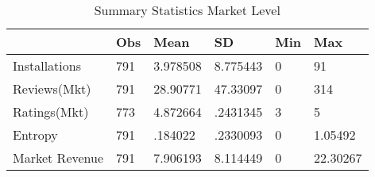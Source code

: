 \begin{table}
\centering
\begin{tabular}{@{}llllll@{}}
\toprule
               & Obs & Mean     & SD       & Min & Max      \\ \midrule
Installations  & 791 & 3.978508 & 8.775443 & 0   & 91       \\
Reviews(Mkt)   & 791 & 28.90771 & 47.33097 & 0   & 314      \\
Ratings(Mkt)   & 773 & 4.872664 & .2431345 & 3   & 5        \\
Entropy        & 791 & .184022  & .2330093 & 0   & 1.05492  \\
Market Revenue & 791 & 7.906193 & 8.114449 & 0   & 22.30267 \\ \bottomrule
\end{tabular}
\caption{Summary Statistics Market Level}
\label{sumstats_mkt}
\end{table}
